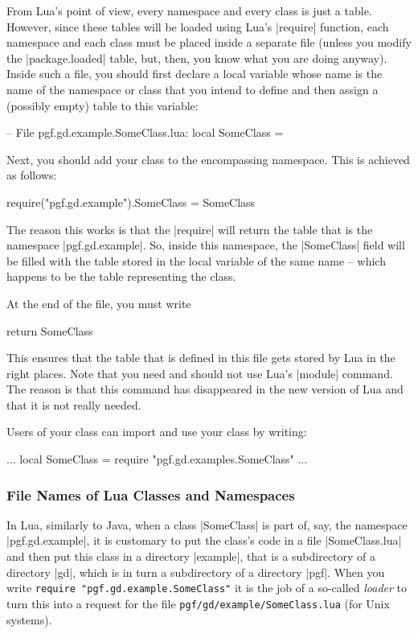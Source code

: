 From Lua's point of view, every namespace and every class is just a
table. However, since these tables will be loaded using Lua's
|require| function, each namespace and each class must be placed
inside a separate file (unless you modify the |package.loaded| table,
but, then, you know what you are doing anyway). Inside such a file, you
should first declare a local variable whose name is the name of the
namespace or class that you intend to define and then assign a
(possibly empty) table to this variable:
\begin{codeexample}
-- File pgf.gd.example.SomeClass.lua:
local SomeClass = {}
\end{codeexample}
Next, you should add your class to the encompassing namespace. This is
achieved as follows:
\begin{codeexample}
require("pgf.gd.example").SomeClass = SomeClass
\end{codeexample}
The reason this works is that the |require| will return the table that
is the namespace |pgf.gd.example|. So, inside this namespace, the
|SomeClass| field will be filled with the table stored in the local
variable of the same name -- which happens to be the table
representing the class.

At the end of the file, you must write
\begin{codeexample}
return SomeClass  
\end{codeexample}
This ensures that the table that is defined in this file gets stored
by Lua in the right places. Note that you need and should not use
Lua's |module| command. The reason is that this command has
disappeared in the new version of Lua and that it is not really
needed. 

Users of your class can import and use your class by writing:
\begin{codeexample}
...
local SomeClass = require "pgf.gd.examples.SomeClass"
...  
\end{codeexample}


\subsubsection{File Names of Lua Classes and Namespaces}

In Lua, similarly to Java, when a class |SomeClass| is part of, say,
the namespace |pgf.gd.example|, it is customary to put the class's
code in a file |SomeClass.lua| and then put this class in a directory
|example|, that is a subdirectory of a directory |gd|, which is in
turn a subdirectory of a directory |pgf|. When you write
\texttt{require "pgf.gd.example.SomeClass"} it is the job of a
so-called \emph{loader} to turn this into a request for the file
\texttt{pgf/gd/example/SomeClass.lua} (for Unix systems).

